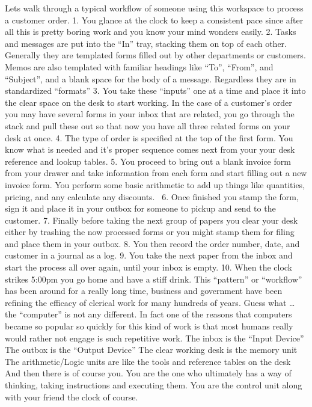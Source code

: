 Lets walk through a typical workflow of someone using this workspace to process a customer order.
    1. You glance at the clock to keep a consistent pace since after all this is pretty boring work and you know your mind wonders easily.
    2. Tasks and messages are put into the “In” tray, stacking them on top of each other. Generally they are templated forms filled out by other departments or customers. Memos are also templated with familiar headings like “To”, “From”, and “Subject”, and a blank space for the body of a message. Regardless they are in standardized “formats”
    3. You take these “inputs” one at a time and place it into the clear space on the desk to start working. In the case of a customer’s order you may have several forms in your inbox that are related, you go through the stack and pull these out so that now you have all three related forms on your desk at once.
    4. The type of order is specified at the top of the first form. You know what is needed and it’s proper sequence comes next from your your desk reference and lookup tables.
    5. You proceed to bring out a blank invoice form from your drawer and take information from each form and start filling out a new invoice form. You perform some basic arithmetic to add up things like quantities, pricing, and any calculate any discounts. 
    6. Once finished you stamp the form, sign it and place it in your outbox for someone to pickup and send to the customer.
    7. Finally before taking the next group of papers you clear your desk either by trashing the now processed forms or you might stamp them for filing and place them in your outbox. 
    8. You then record the order number, date, and customer in a journal as a log. 
    9. You take the next paper from the inbox and start the process all over again, until your inbox is empty.
    10.  When the clock strikes 5:00pm you go home and have a stiff drink. 
This “pattern” or “workflow” has been around for a really long time, business and government have been refining the efficacy of clerical work for many hundreds of years. Guess what … the “computer” is not any different. In fact one of the reasons that computers became so popular so quickly for this kind of work is that most humans really would rather not engage is such repetitive work. 
The inbox is the “Input Device”
The outbox is the “Output Device”
The clear working desk is the memory unit
The arithmetic/Logic units are like the tools and reference tables on the desk
And then there is of course you. You are the one who ultimately has a way of thinking, taking instructions and executing them. You are the control unit along with your friend the clock of course.
